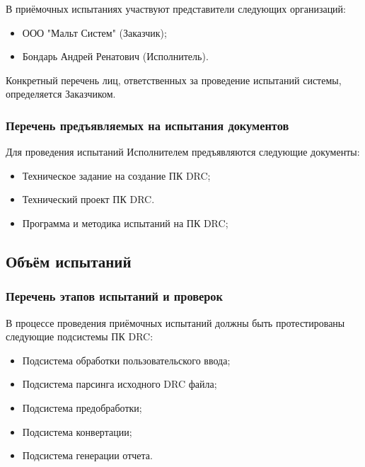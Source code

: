 В приёмочных испытаниях участвуют представители следующих организаций:

\begin{itemize}
	\item ООО "Мальт Систем" (Заказчик);
	\item Бондарь Андрей Ренатович (Исполнитель).
\end{itemize}

Конкретный перечень лиц, ответственных за проведение испытаний системы,
определяется Заказчиком.

\subsubsection{Перечень предъявляемых на испытания документов}

Для проведения испытаний Исполнителем предъявляются следующие документы:

\begin{itemize}
	\item Техническое задание на создание ПК DRC;
	\item Технический проект ПК DRC.
	\item Программа и методика испытаний на ПК DRC;
\end{itemize}

\subsection{Объём испытаний}

\subsubsection{Перечень этапов испытаний и проверок}

В процессе проведения приёмочных испытаний должны
быть протестированы следующие подсистемы ПК DRC:

\begin{itemize}
	\item Подсистема обработки пользовательского ввода;
	\item Подсистема парсинга исходного DRC файла;
	\item Подсистема предобработки;
	\item Подсистема конвертации;
	\item Подсистема генерации отчета.
\end{itemize}

